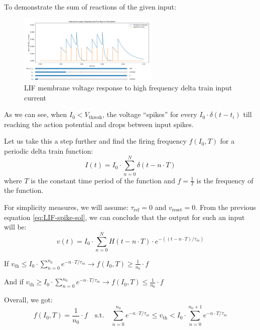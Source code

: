 To demonstrate the sum of reactions of the given input:

\begin{figure}[H]
    \centering
    \includegraphics[width=0.6\textwidth]{scientific-background/computational-models/LIF/graphs/LIF-high-freq-spike-response-ref.png}
    \caption{LIF membrane voltage response to high frequency delta train input current}
    \label{fig:LIF-high-freq-spike-ref}
\end{figure}

As we can see, when \(I_0 < V_{\text{thresh}}\), the voltage “spikes” for every \(I_0 \cdot \delta(t-t_i)\) till reaching the action potential and drops between input spikes. 

Let us take this a step further and find the firing frequency \(f(I_0, T)\) for a periodic delta train function:
\begin{equation}
I(t) = I_0 \cdot \sum_{n=0}^N \delta(t-n \cdot T)
\end{equation}
where \(T\) is the constant time period of the function and \(f = \frac{1}{T}\) is the frequency of the function.

For simplicity measures, we will assume: \(\tau_{\text{ref}} = 0\) and \(v_{\text{reset}} = 0\).
From the previous equation \ref{eq:LIF-spike-sol}, we can conclude that the output for such an input will be:
\begin{equation}
v(t) = I_0 \cdot \sum_{n=0}^N H(t-n \cdot T) \cdot e^{-((t-n \cdot T)/\tau_m)}
\end{equation}

If \(v_{\text{th}} \leq I_0 \cdot \sum_{n=0}^{n_0} e^{-n \cdot T/\tau_m} \rightarrow f(I_0, T) \geq \frac{1}{n_0} \cdot f\)

And if \(v_{\text{th}} \geq I_0 \cdot \sum_{n=0}^{n_0} e^{-n \cdot T/\tau_m} \rightarrow f(I_0, T) \leq \frac{1}{n_0} \cdot f\)

Overall, we got:
\begin{equation}
f(I_0, T) = \frac{1}{n_0} \cdot f \quad \text{s.t.} \quad \sum_{n=0}^{n_0} e^{-n \cdot T/\tau_m} \leq v_{\text{th}} < I_0 \cdot \sum_{n=0}^{n_0+1} e^{-n \cdot T/\tau_m}
\end{equation}

